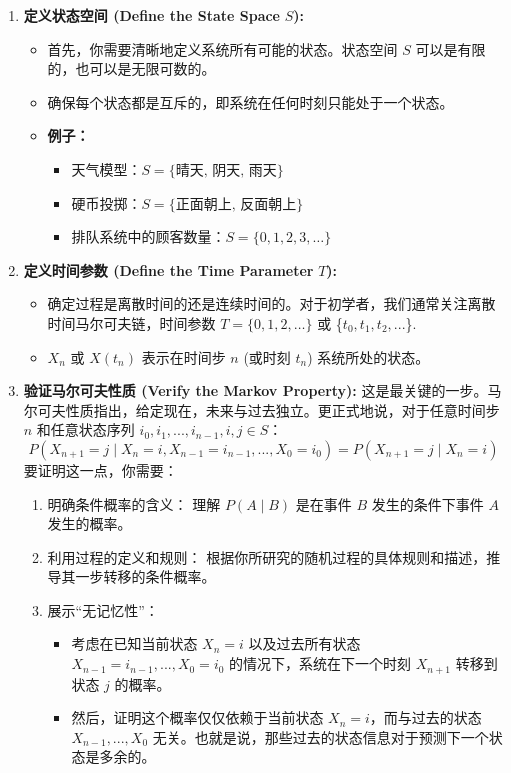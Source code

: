\begin{enumerate}
	\item \textbf{定义状态空间 (Define the State Space} $S$\textbf{):}
	\begin{itemize}
		\item 首先，你需要清晰地定义系统所有可能的状态。状态空间 $S$ 可以是有限的，也可以是无限可数的。
		\item 确保每个状态都是互斥的，即系统在任何时刻只能处于一个状态。
		\item \textbf{例子：}
		\begin{itemize}
			\item 天气模型：$S= \{ \text{晴天, 阴天, 雨天} \}$
			\item 硬币投掷：$S=\{ \text{正面朝上, 反面朝上} \}$
			\item 排队系统中的顾客数量：$S=\{ 0,1,2,3,\dots \}$
		\end{itemize}
	\end{itemize}
	\item \textbf{定义时间参数 (Define the Time Parameter} $T$\textbf{):}
	\begin{itemize}
		\item 确定过程是离散时间的还是连续时间的。对于初学者，我们通常关注离散时间马尔可夫链，时间参数 $T=\{0,1,2,\dots\}$ 或 \{$t_0, t_1, t_2, ...$\}.
		\item $X_n$ 或 $X(t_n)$ 表示在时间步 $n$ (或时刻 $t_n$) 系统所处的状态。
	\end{itemize}
	\item \textbf{验证马尔可夫性质 (Verify the Markov Property):}
这是最关键的一步。马尔可夫性质指出，给定现在，未来与过去独立。更正式地说，对于任意时间步 $n$ 和任意状态序列 $i_0, i_1, ..., i_{n-1}, i, j \in S$：
\[
P(X_{n+1}=j \mid X_n=i, X_{n-1}=i_{n-1},...,X_0=i_0) = P(X_{n+1}=j \mid X_n=i)
\]要证明这一点，你需要：
	\begin{enumerate}
		\item 明确条件概率的含义： 理解 $P(A \mid B)$ 是在事件 $B$ 发生的条件下事件 $A$ 发生的概率。
		\item 利用过程的定义和规则： 根据你所研究的随机过程的具体规则和描述，推导其一步转移的条件概率。
		\item 展示“无记忆性”：
		\begin{itemize}
			\item 考虑在已知当前状态 $X_n=i$ 以及过去所有状态 $X_{n-1}=i_{n-1},...,X_0=i_0$ 的情况下，系统在下一个时刻 $X_{n+1}$ 转移到状态 $j$ 的概率。
			\item 然后，证明这个概率仅仅依赖于当前状态 $X_n=i$，而与过去的状态 $X_{n-1},...,X_0$ 无关。也就是说，那些过去的状态信息对于预测下一个状态是多余的。

\end{itemize}
\end{enumerate}
\end{enumerate}
